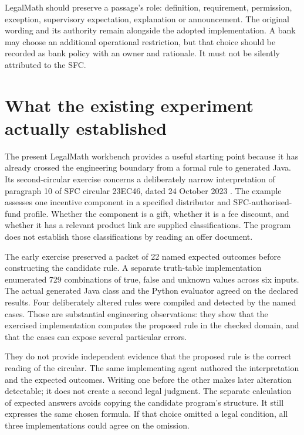 \documentclass[12pt,a4paper,oneside,openany]{book}
\begin{document}
LegalMath should preserve a passage's role: definition, requirement, permission,
exception, supervisory expectation, explanation or announcement. The original
wording and its authority remain alongside the adopted implementation. A bank may
choose an additional operational restriction, but that choice should be recorded
as bank policy with an owner and rationale. It must not be silently attributed to
the SFC.

\section{What the existing experiment actually established}
\label{merge:M01:01}

\label{sec:problem-evidence}
The present LegalMath workbench provides a useful starting point because it has
already crossed the engineering boundary from a formal rule to generated Java.
Its second-circular exercise concerns a deliberately narrow interpretation of
paragraph 10 of SFC circular 23EC46, dated 24 October 2023
\citep{sfcmarketing}. The example assesses one incentive component in a specified
distributor and SFC-authorised-fund profile. Whether the component is a gift,
whether it is a fee discount, and whether it has a relevant product link are
supplied classifications. The program does not establish those classifications
by reading an offer document.

The early exercise preserved a packet of 22 named expected outcomes before constructing
the candidate rule. A separate truth-table implementation enumerated 729
combinations of true, false and unknown values across six inputs. The actual
generated Java class and the Python evaluator agreed on the declared results.
Four deliberately altered rules were compiled and detected by the named cases.
Those are substantial engineering observations: they show that the exercised
implementation computes the proposed rule in the checked domain, and that the
cases can expose several particular errors.

They do not provide independent evidence that the proposed rule is the correct
reading of the circular. The same implementing agent authored the interpretation
and the expected outcomes. Writing one before the other makes later alteration
detectable; it does not create a second legal judgment. The separate calculation
of expected answers avoids copying the candidate program's structure. It still
expresses the same chosen formula. If that choice omitted a legal condition,
all three implementations could agree on the omission.
\end{document}
